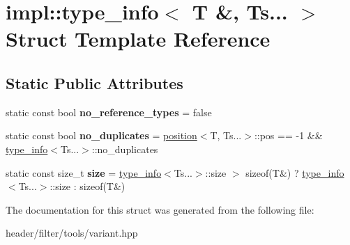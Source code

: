 \hypertarget{structimpl_1_1type__info_3_01_t_01_6_00_01_ts_8_8_8_01_4}{}\section{impl\+:\+:type\+\_\+info$<$ T \&, Ts... $>$ Struct Template Reference}
\label{structimpl_1_1type__info_3_01_t_01_6_00_01_ts_8_8_8_01_4}
\subsection*{Static Public Attributes}
\begin{DoxyCompactItemize}
\item 
\mbox{\label{structimpl_1_1type__info_3_01_t_01_6_00_01_ts_8_8_8_01_4_ac8c138c6ec317ec274149a3a3db647df}} 
static const bool {\bfseries no\+\_\+reference\+\_\+types} = false
\item 
\mbox{\label{structimpl_1_1type__info_3_01_t_01_6_00_01_ts_8_8_8_01_4_aea2826d9d85733d998a60cdc8d263e20}} 
static const bool {\bfseries no\+\_\+duplicates} = \hyperlink{structimpl_1_1position}{position}$<$T, Ts...$>$\+::pos == -\/1 \&\& \hyperlink{structimpl_1_1type__info}{type\+\_\+info}$<$Ts...$>$\+::no\+\_\+duplicates
\item 
\mbox{\label{structimpl_1_1type__info_3_01_t_01_6_00_01_ts_8_8_8_01_4_aa27ef869750bdcafe836cd6ee6f0fed1}} 
static const size\+\_\+t {\bfseries size} = \hyperlink{structimpl_1_1type__info}{type\+\_\+info}$<$Ts...$>$\+::size $>$ sizeof(T\&) ? \hyperlink{structimpl_1_1type__info}{type\+\_\+info}$<$Ts...$>$\+::size \+: sizeof(T\&)
\end{DoxyCompactItemize}


The documentation for this struct was generated from the following file\+:\begin{DoxyCompactItemize}
\item 
header/filter/tools/variant.\+hpp\end{DoxyCompactItemize}
